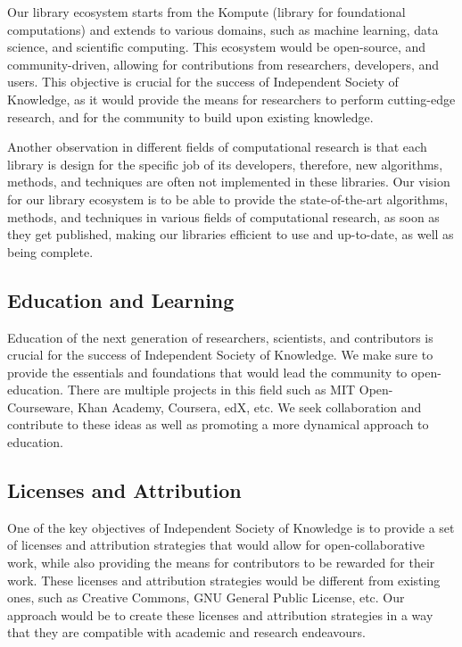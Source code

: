 Our library ecosystem starts from the Kompute (library for foundational computations) and extends to various domains, such as machine learning, data science, and scientific computing.
This ecosystem would be open-source, and community-driven, allowing for contributions from researchers, developers, and users.
This objective is crucial for the success of Independent Society of Knowledge, as it would provide the means for researchers to perform cutting-edge research, and for the community to build upon existing knowledge.

Another observation in different fields of computational research is that each library is design for the specific job of its developers, therefore, new algorithms, methods, and techniques are often not implemented in these libraries.
Our vision for our library ecosystem is to be able to provide the state-of-the-art algorithms, methods, and techniques in various fields of computational research, as soon as they get published, making our libraries efficient to use and up-to-date, as well as being complete.

\subsection{Education and Learning}\label{subsec:education-and-learning}
Education of the next generation of researchers, scientists, and contributors is crucial for the success of Independent Society of Knowledge.
We make sure to provide the essentials and foundations that would lead the community to open-education.
There are multiple projects in this field such as MIT Open-Courseware, Khan Academy, Coursera, edX, etc.
We seek collaboration and contribute to these ideas as well as promoting a more dynamical approach to education.

\subsection{Licenses and Attribution}\label{subsec:licenses-and-attribution}
One of the key objectives of Independent Society of Knowledge is to provide a set of licenses and attribution strategies that would allow for open-collaborative work, while also providing the means for contributors to be rewarded for their work.
These licenses and attribution strategies would be different from existing ones, such as Creative Commons, GNU General Public License, etc.
Our approach would be to create these licenses and attribution strategies in a way that they are compatible with academic and research endeavours.

